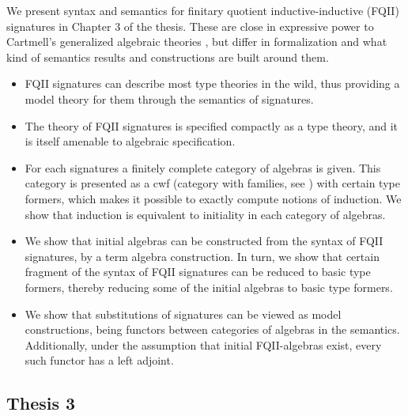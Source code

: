\documentclass[12pt]{article}
\begin{document}
We present syntax and semantics for finitary quotient inductive-inductive (FQII)
signatures in Chapter 3 of the thesis. These are close in expressive power to
Cartmell's generalized algebraic theories \cite{gat}, but differ in
formalization and what kind of semantics results and constructions are built
around them.
\begin{itemize}
\item FQII signatures can describe most type theories in the wild, thus
      providing a model theory for them through the semantics of signatures.
\item The theory of FQII signatures is specified compactly as a type theory, and
      it is itself amenable to algebraic specification.
\item For each signatures a finitely complete category of algebras is given. This
      category is presented as a cwf (category with families, see \cite{cwfs}) with
      certain type formers, which makes it possible to exactly compute notions of
      induction. We show that induction is equivalent to initiality in each category
      of algebras.
\item We show that initial algebras can be constructed from the syntax of FQII signatures,
      by a term algebra construction. In turn, we show that certain fragment of the syntax
      of FQII signatures can be reduced to basic type formers, thereby reducing some of
      the initial algebras to basic type formers.
\item We show that substitutions of signatures can be viewed as model constructions, being
      functors between categories of algebras in the semantics. Additionally, under the
      assumption that initial FQII-algebras exist, every such functor has a left adjoint.
\end{itemize}

\subsection*{Thesis 3}







\end{document}
